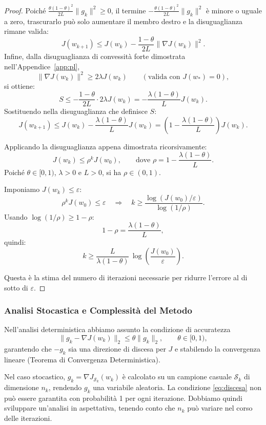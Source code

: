 \documentclass[a4paper,12pt]{article}
\numberwithin{equation}{section}
\numberwithin{figure}{section}
\numberwithin{table}{section}
\begin{document}
\begin{proof}
  Poiché $\frac{\theta(1-\theta)^2}{2L}\|g_k\|^2 \ge 0$, il termine $-\frac{\theta(1-\theta)^2}{2L}\|g_k\|^2$ è minore o uguale a zero, trascurarlo può solo aumentare il membro destro e la disuguaglianza rimane valida:
  \[
  J(w_{k+1}) \le J(w_k) - \frac{1-\theta}{2L}\|\nabla J(w_k)\|^2.
  \]
  Infine, dalla disuguaglianza di convessità forte dimostrata nell'Appendice~\ref{app:pl},
  \[
  \|\nabla J(w_k)\|^2 \ge 2\lambda J(w_k) \qquad (\text{valida con } J(w_*)=0),
  \]
  si ottiene:
\[
S \le -\frac{1-\theta}{2L} \cdot 2\lambda J(w_k)
= -\frac{\lambda(1-\theta)}{L} J(w_k).
\]
Sostituendo nella disuguaglianza che definisce $S$:
\[
J(w_{k+1}) \le J(w_k) - \frac{\lambda(1-\theta)}{L} J(w_k)
= \left(1 - \frac{\lambda(1-\theta)}{L}\right) J(w_k).
\]

Applicando la disuguaglianza appena dimostrata ricorsivamente:
\[
J(w_k) \le \rho^k J(w_0), \qquad \text{dove } \rho = 1 - \frac{\lambda(1-\theta)}{L}.
\]
Poiché $\theta \in [0,1)$, $\lambda > 0$ e $L > 0$, si ha $\rho \in (0,1)$.

Imponiamo $J(w_k) \le \varepsilon$:
\[
\rho^k J(w_0) \le \varepsilon \quad\Longrightarrow\quad k \ge \frac{\log(J(w_0)/\varepsilon)}{\log(1/\rho)}.
\]
Usando $\log(1/\rho) \ge 1-\rho$:
\[
1 - \rho = \frac{\lambda(1-\theta)}{L},
\]
quindi:
\[
k \ge \frac{L}{\lambda(1-\theta)}\,\log\!\left(\frac{J(w_0)}{\varepsilon}\right).
\]

Questa è la stima del numero di iterazioni necessarie per ridurre l'errore al di sotto di $\varepsilon$.
\end{proof}

\subsubsection{Analisi Stocastica e Complessità del Metodo}

Nell'analisi deterministica abbiamo assunto la condizione di accuratezza
\[
\|g_k - \nabla J(w_k)\|_2 \le \theta \|g_k\|_2, \qquad \theta \in [0,1), \tag{5.1}\label{eq:discesa}
\]
garantendo che \(-g_k\) sia una direzione di discesa per \(J\) e stabilendo la convergenza lineare (Teorema di Convergenza Deterministica).

Nel caso stocastico, \(g_k = \nabla J_{\mathcal{S}_k}(w_k)\) è calcolato su un campione casuale \(\mathcal{S}_k\) di dimensione \(n_k\), rendendo \(g_k\) una variabile aleatoria. La condizione \eqref{eq:discesa} non può essere garantita con probabilità 1 per ogni iterazione. Dobbiamo quindi sviluppare un'analisi in aspettativa, tenendo conto che \(n_k\) può variare nel corso delle iterazioni.
\end{document}
